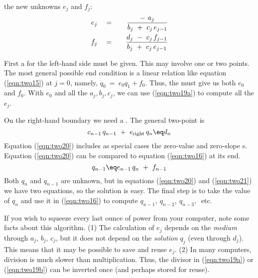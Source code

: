 the new unknowns  $e_j$  and  $f_j$:
\begin{eqnarray}
e_j \ \ \ & = & \ \ \  { - \  a_j   \over  b_j \ +\  c_j \, e_{j-1} }
\label{eqn:two19a}
\\
f_j \ \ \ & = & \ \ \ 
             { d_j \ -\  c_j \, f_{j-1}   \over  b_j \ +\  c_j \, e_{j-1} }
\label{eqn:two19b}
\end{eqnarray}
\par
First a  for the left-hand side must be given.
This may involve one or two points.
The most general possible end condition is a linear relation like
equation (\ref{eqn:two15}) at $j=0$, namely, $q_0 \ =\ e_0 q_1 + f_0$.
Thus, the \bx{boundary condition} must give us both  $e_0$  and  $f_0$.
With  $e_0$  and all the  $a_j , b_j , c_j $,  we
can use (\ref{eqn:two19a}) to compute all the $e_j$.
\par
On the right-hand boundary we need a .
The general two-point \bx{boundary condition} is
\begin{equation}
c_{n-1} \, q_{n-1} \ +\  e_{\rm right} \, q_n  \eq  d_n
\label{eqn:two20}
\end{equation}
Equation (\ref{eqn:two20}) includes as special cases the
zero-value and zero-slope s.
Equation (\ref{eqn:two20}) can be compared to equation (\ref{eqn:two16})
at its end.
\begin{equation}
q_{n-1}  \eq  e_{n-1} \, q_n \ +\  f_{n-1} 
\label{eqn:two21}
\end{equation}
Both  $q_n $  and  $q_{n-1}$  are unknown,
but in equations (\ref{eqn:two20}) and (\ref{eqn:two21}) we have two equations,
so the solution is easy.
The final step is to take the value of  $q_n$  and use it
in (\ref{eqn:two16}) to compute $q_{n-1} , \ q_{n-2} , \ q_{n-3} , \ $ etc.
\begin{comment}
The subroutine {\tt rtris()} solves
equation~(\ref{eqn:two13b}) for $q$ where
{\tt n=5},
{\tt endl}$=e_{\rm left}$,
{\tt endr}$=e_{\rm right}$,
{\tt  a=c}$=-\alpha$, and
{\tt    b}$=1-2\alpha$.
\progdex{rtris}{real tridiagonal solver}
\end{comment}
\par
If you wish to squeeze every last ounce of power from your computer,
note some facts about this algorithm.
(1) The calculation of  $e_j$  depends
on the %
{\em  medium %
} through $a_j$, $b_j$, $c_j$, but
it does not depend
on the 
{\em  solution}
$q_j$  (even through $d_j$).
This means that it may be possible to save and reuse  $e_j$.
(2) In many computers, division is much slower than multiplication.
Thus, the divisor in
(\ref{eqn:two19a}) or
(\ref{eqn:two19b})
can be inverted once
(and perhaps stored for reuse).

